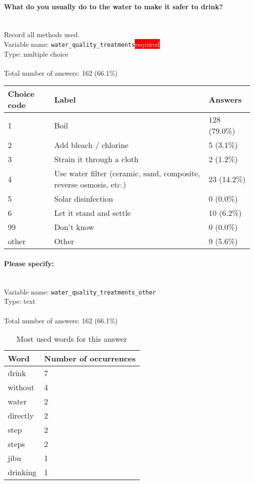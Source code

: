 \documentclass[11.5pt, a4paper]{scrartcl}
\begin{document}
\paragraph{What do you usually do to the water to make it safer to drink? }
\ \\ {\small Record all methods used. }
\  \\Variable name: \texttt{water\_quality\_treatments}\hfill\colorbox{red}{\small{\textcolor{white}{required}}}\\
 Type: multiple choice\\
\\Total number of answers: 162 (66.1\%)
\\[0.2em] \begin{tabular}{p{4cm}|p{8cm}|p{3cm}}
Choice code & Label & Answers \\
\hline
1 & Boil & \cellcolor{color3}128 (79.0\%)\\
\cellcolor{mygray} 2 & \cellcolor{mygray}Add bleach / chlorine  & \cellcolor{color0}5 (3.1\%)\\
3 & Strain it through a cloth & \cellcolor{color0}2 (1.2\%)\\
\cellcolor{mygray} 4 & \cellcolor{mygray}Use water filter (ceramic, sand, composite, reverse osmosis, etc.)  & \cellcolor{color0}23 (14.2\%)\\
5 & Solar disinfection & \cellcolor{color0}0 (0.0\%)\\
\cellcolor{mygray} 6 & \cellcolor{mygray}Let it stand and settle  & \cellcolor{color0}10 (6.2\%)\\
99 & Don’t know& \cellcolor{color0}0 (0.0\%)\\
\cellcolor{mygray} other & \cellcolor{mygray}Other & \cellcolor{color0}9 (5.6\%)\\
\end{tabular}
\paragraph{Please specify:}
\  \\Variable name: \texttt{water\_quality\_treatments\_other}\\
Type: text\\
\\Total number of answers: 162 (66.1\%)
\\[0.2em]\begin{table}[H]
 \begin{tabular}{p{4cm}|p{8cm}}
Word & Number of occurrences  \\
\hline
\cellcolor{mygray}drink&\cellcolor{mygray}7\\
\hline
without&4\\
\hline
\cellcolor{mygray}water&\cellcolor{mygray}2\\
\hline
directly&2\\
\hline
\cellcolor{mygray}step&\cellcolor{mygray}2\\
\hline
steps&2\\
\hline
\cellcolor{mygray}jibu&\cellcolor{mygray}1\\
\hline
drinking&1\\
\hline
\end{tabular}
\caption{\label{tab:table-name} Most used words for this answer}
\end{table}
\end{document}
